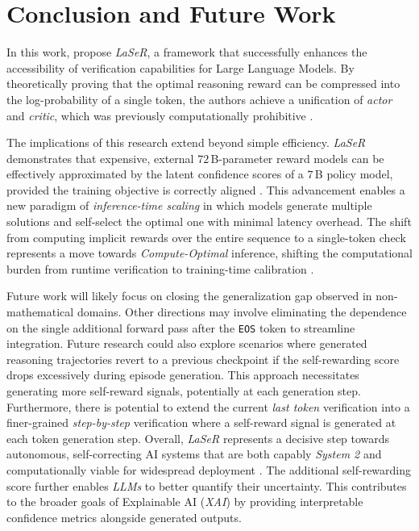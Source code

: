 \documentclass[a4paper,oneside,10pt,ngerman,english]{scrartcl}
\begin{document}
\section{Conclusion and Future Work}
\label{sec:conclusion}

In this work, \citet{laser} propose \textit{LaSeR}, a framework that successfully enhances the accessibility of verification capabilities for Large Language Models. By theoretically proving that the optimal reasoning reward can be compressed into the log-probability of a single token, the authors achieve a unification of \textit{actor} and \textit{critic}, which was previously computationally prohibitive \citep{laser}.

The implications of this research extend beyond simple efficiency. \textit{LaSeR} demonstrates that expensive, external $72$\,B-parameter reward models can be effectively approximated by the latent confidence scores of a $7$\,B policy model, provided the training objective is correctly aligned \citep{laser}. This advancement enables a new paradigm of \textit{inference-time scaling} in which models generate multiple solutions and self-select the optimal one with minimal latency overhead. The shift from computing implicit rewards over the entire sequence to a single-token check represents a move towards \textit{Compute-Optimal} inference, shifting the computational burden from runtime verification to training-time calibration \citep{laser}.

Future work will likely focus on closing the generalization gap observed in non-mathematical domains. Other directions may involve eliminating the dependence on the single additional forward pass after the \texttt{EOS} token to streamline integration. Future research could also explore scenarios where generated reasoning trajectories revert to a previous checkpoint if the self-rewarding score drops excessively during episode generation. This approach necessitates generating more self-reward signals, potentially at each generation step. Furthermore, there is potential to extend the current \textit{last token} verification into a finer-grained \textit{step-by-step} verification where a self-reward signal is generated at each token generation step. Overall, \textit{LaSeR} represents a decisive step towards autonomous, self-correcting AI systems that are both capably \textit{System 2} and computationally viable for widespread deployment \citep{laser}. The additional self-rewarding score further enables \textit{LLMs} to better quantify their uncertainty. This contributes to the broader goals of Explainable AI (\textit{XAI}) by providing interpretable confidence metrics alongside generated outputs.


\cleardoubleoddpage


\end{document}
